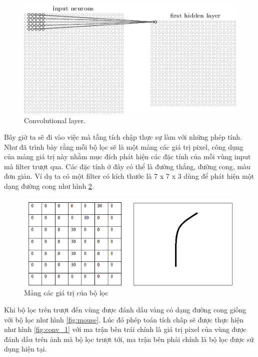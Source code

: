 		\begin{figure}[h!]
			\centering
			\includegraphics[scale=0.9]{charts/conv_layer2.png}
			\caption{Convolutional layer.\cite{conv-layer}}
			\label{fig:conv_layer2}
		\end{figure}
		
		Bây giờ ta sẽ đi vào việc mà tầng tích chập thực sự làm với những phép tính. Như đã trình bày rằng mỗi bộ lọc sẽ là một mảng các giá trị pixel, công dụng của mảng giá trị này nhằm mục đích phát hiện các đặc tính của mỗi vùng input mà filter trượt qua. Các đặc tính ở đây có thể là đường thẳng, đường cong, màu đơn giản. Ví dụ ta có một filter có kích thước là 7 x 7 x 3 dùng để phát hiện một dạng đường cong như hình \ref{fig:filter}.
		
		\begin{figure}[h!]
			\centering
			\includegraphics[scale=0.5]{charts/filter.png}
			\caption{Mảng các giá trị của bộ lọc \cite{conv-layer}}
			\label{fig:filter}
		\end{figure}
		
		Khi bộ lọc trên trượt đến vùng được đánh dấu vàng có dạng đường cong giống với bộ lọc như hình \ref{fig:mouse}. Lúc đó phép toán   tích châp sẽ được thực hiện như hình \ref{fig:conv_1} với ma trận bên trái chính là giá trị pixel của vùng được đánh dấu trên ảnh mà bộ lọc trượt tới, ma trận bên phải chính là bộ lọc được sử dụng hiện tại.
		
